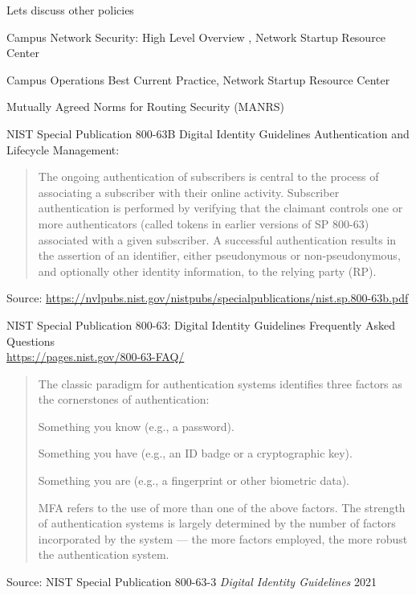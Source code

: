 \documentclass[Screen16to9,17pt]{foils}
\begin{document}


Lets discuss other policies

Campus Network Security: High Level Overview , Network Startup Resource Center

Campus Operations Best Current Practice, Network Startup Resource Center

Mutually Agreed Norms for Routing Security (MANRS)









NIST Special Publication 800-63B
Digital Identity Guidelines
Authentication and Lifecycle Management:
\begin{quote}
The ongoing authentication of subscribers is central to the process of associating a subscriber
with their online activity. Subscriber authentication is performed by verifying that the claimant
controls one or more authenticators (called tokens in earlier versions of SP 800-63) associated
with a given subscriber. A successful authentication results in the assertion of an identifier, either
pseudonymous or non-pseudonymous, and optionally other identity information, to the relying
party (RP).
\end{quote}
Source: \url{https://nvlpubs.nist.gov/nistpubs/specialpublications/nist.sp.800-63b.pdf}

\begin{list2}
\item
    \item NIST Special Publication 800-63: Digital Identity Guidelines
Frequently Asked Questions\\
\url{https://pages.nist.gov/800-63-FAQ/}
\end{list2}




\begin{quote}
The classic paradigm for authentication systems identifies three factors as the cornerstones of
authentication:
\begin{list2}
\item Something you know (e.g., a password).
\item Something you have (e.g., an ID badge or a cryptographic key).
\item Something you are (e.g., a fingerprint or other biometric data).
\end{list2}
MFA refers to the use of more than one of the above factors. The strength of authentication
systems is largely determined by the number of factors incorporated by the system — the more
factors employed, the more robust the authentication system.
\end{quote}
Source: NIST Special Publication 800-63-3 \emph{Digital Identity Guidelines} 2021
\end{document}
